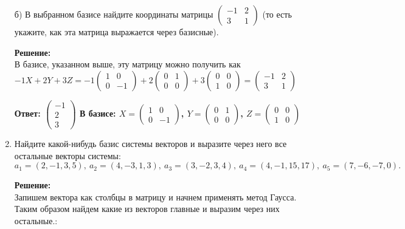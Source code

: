\documentclass[a4paper,12pt]{article}
\begin{document}
\begin{enumerate}
б) В выбранном базисе найдите координаты матрицы $\left(\begin{smallmatrix}
-1 & 2 \\
3 & 1
\end{smallmatrix} \right)$ (то есть укажите, как эта матрица выражается через базисные).

\vspace{5pt}
\textbf{Решение:}\\
В базисе, указанном выше, эту матрицу можно получить как $-1 X+2Y+3Z= -1\left(\begin{smallmatrix}
1 & 0 \\
0 & -1
\end{smallmatrix} \right) +2 \left(\begin{smallmatrix}
0 & 1 \\
0 & 0
\end{smallmatrix} \right)+3 \left(\begin{smallmatrix}
0 & 0 \\
1 & 0
\end{smallmatrix} \right)= \left(\begin{smallmatrix}
-1 & 2 \\
3 & 1
\end{smallmatrix} \right)$


\textbf{Ответ:
$\begin{pmatrix}
{-1}\\{2}\\{3}\end{pmatrix}$ 
В базисе:
$X = \left(\begin{smallmatrix}
1 & 0 \\
0 & -1
\end{smallmatrix} \right)$, $Y = \left(\begin{smallmatrix}
0 & 1 \\
0 & 0
\end{smallmatrix} \right)$, $Z = \left(\begin{smallmatrix}
0 & 0 \\
1 & 0
\end{smallmatrix} \right)$}

\item Найдите какой-нибудь базис системы векторов и выразите через него все остальные векторы системы:
$$a_1 = (2, -1, 3, 5), \ a_2 = (4, -3, 1, 3), \ a_3 = (3, -2, 3, 4), \ a_4 = (4, -1, 15, 17), \ a_5 = (7, -6, -7, 0).$$ 

\vspace{5pt}
\textbf{Решение:}\\
Запишем вектора как столбцы в матрицу и начнем применять метод Гаусса. Таким образом найдем какие из векторов главные и выразим через них остальные.:


\end{enumerate}
\end{document}
